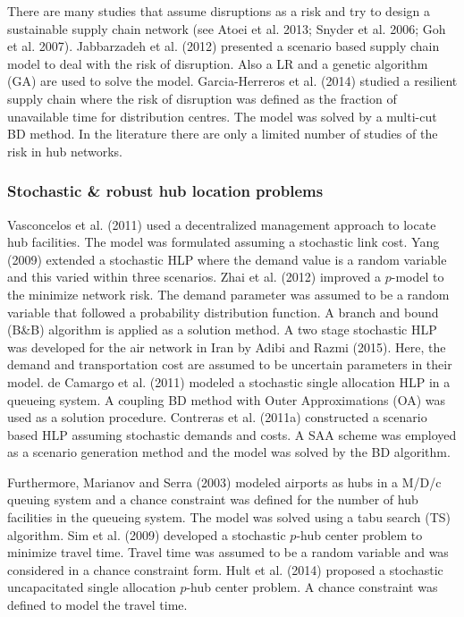 \documentclass[review]{elsarticle}
\begin{document}
There are many studies that assume disruptions as a risk and try to design a sustainable supply chain network (see Atoei et al. 2013; Snyder et al. 2006; Goh et al. 2007). Jabbarzadeh et al. (2012) presented a scenario based supply chain model to deal with the risk of disruption. Also a LR and a genetic algorithm (GA) are used to solve the model. Garcia-Herreros et al. (2014) studied a resilient supply chain where the risk of disruption was defined as the fraction of unavailable time for distribution centres. The model was solved by a multi-cut BD method. In the literature there are only a limited number of studies of the risk in hub networks.

\subsubsection{Stochastic \rm{\&} robust hub location problems}

Vasconcelos et al. (2011) used a decentralized management approach to locate hub facilities. The model was formulated assuming a stochastic link cost. Yang (2009) extended a stochastic HLP where the demand value is a random variable and this varied within three scenarios. Zhai et al. (2012) improved a $p$-model to the minimize network risk. The demand parameter was assumed to be a random variable that followed a probability distribution function. A branch and bound (B\&B) algorithm is applied as a solution method. A two stage stochastic HLP was developed for the air network in Iran by Adibi and Razmi (2015). Here, the demand and transportation cost are assumed to be uncertain parameters in their model. de Camargo et al. (2011) modeled a stochastic single allocation HLP in a queueing system. A coupling BD method with Outer Approximations (OA) was used as a solution procedure. Contreras et al. (2011a) constructed a scenario based HLP assuming stochastic demands and costs. A SAA scheme was employed as a scenario generation method and the model was solved by the BD algorithm.

Furthermore, Marianov and Serra (2003) modeled airports as hubs in a M/D/c queuing system and a chance constraint was defined for the number of hub facilities in the queueing system. The model was solved using a tabu search (TS) algorithm. Sim et al. (2009) developed a stochastic $p$-hub center problem to minimize travel time. Travel time was assumed to be a random variable and was considered in a chance constraint form. Hult et al. (2014) proposed a stochastic uncapacitated single allocation $p$-hub center problem. A chance constraint was defined to model the travel time. 
\end{document}
